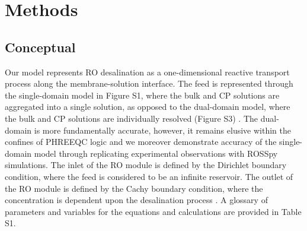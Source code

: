 \documentclass[journal=ACSES&TWater,manuscript=article]{achemso}
\begin{document}
\section{Methods}

\subsection{Conceptual}

Our model represents RO desalination as a one-dimensional reactive transport process along the membrane-solution interface. The feed is represented through the single-domain model in Figure S1, where the bulk and CP solutions are aggregated into a single solution, as opposed to the dual-domain model, where the bulk and CP solutions are individually resolved (Figure S3) \cite{Chen2016AssessingModel,Scruggs2019TheInterface,Greskowiak2015AUVI,Mieles2012AnalyticalSystem}. The dual-domain is more fundamentally accurate, however, it remains elusive within the confines of PHREEQC logic and we moreover demonstrate accuracy of the single-domain model through replicating experimental observations with ROSSpy simulations. The inlet of the RO module is defined by the Dirichlet boundary condition, where the feed is considered to be an infinite reservoir. The outlet of the RO module is defined by the Cachy boundary condition, where the concentration is dependent upon the desalination process \cite{Gosses2018ExplicitModels,Moes2006ImposingMethod,Bazilevs2007WeakMechanics}. A glossary of parameters and variables for the equations and calculations are provided in Table S1.
\end{document}
